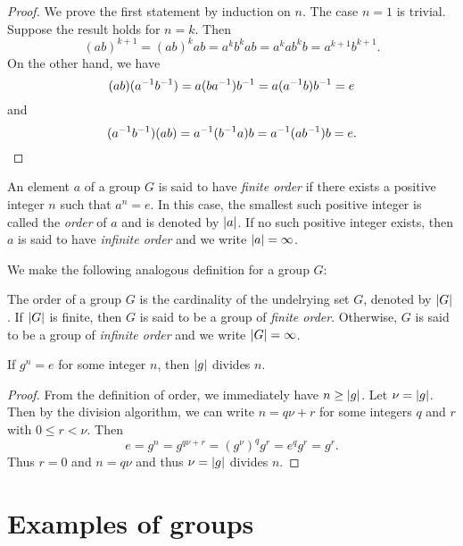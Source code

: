 \begin{proof}
    We prove the first statement by induction on \(n\). The case \(n = 1\) is
    trivial. Suppose the result holds for \(n = k\). Then
    \[
        (ab)^{k + 1} = (ab)^k ab = a^k b^k ab = a^k a b^k b = a^{k + 1} b^{k + 1}.
    \]
    On the other hand, we have
    \[
        (ab)(a^{-1} b^{-1}) = a(ba^{-1})b^{-1} = a(a^{-1} b)b^{-1} = e
    \]
    and
    \[
        (a^{-1} b^{-1})(ab) = a^{-1}(b^{-1} a)b = a^{-1}(a b^{-1})b = e.
    \]
\end{proof}

\begin{definition}
    An element \(a\) of a group \(G\) is said to have \emph{finite order} if
    there exists a positive integer \(n\) such that \(a^n = e\). In this case,
    the smallest such positive integer is called the \emph{order} of \(a\) and
    is denoted by \(\lvert a \rvert\). If no such positive integer exists, then \(a\)
    is said to have \emph{infinite order} and we write \(\lvert a \rvert = \infty\).
\end{definition}

We make the following analogous definition for a group \(G\):

\begin{definition}
    The order of a group \(G\) is the cardinality of the undelrying set \(G\),
    denoted by \(\lvert G \rvert\). If \(\lvert G \rvert\) is finite, then \(G\) is said to
    be a group of \emph{finite order}. Otherwise, \(G\) is said to be a group of
    \emph{infinite order} and we write \(\lvert G \rvert = \infty\).
\end{definition}

\begin{theorem}
    If \(g^n = e\) for some integer \(n\), then \(\lvert g \rvert\) divides \(n\).
\end{theorem}

\begin{proof}
    From the definition of order, we immediately have \(n \geq \lvert g \rvert\). Let
    \(\nu = \lvert g \rvert\). Then by the division algorithm, we can write \(n = q\nu
    + r\) for some integers \(q\) and \(r\) with \(0 \leq r < \nu\). Then
    \[
        e = g^n = g^{q\nu + r} = (g^\nu)^q g^r = e^q g^r = g^r.
    \]
    Thus \(r = 0\) and \(n = q\nu\) and thus \(\nu = \lvert g \rvert\) divides \(n\).
\end{proof}

\section{Examples of groups}
\label{sec:examples-of-groups}

